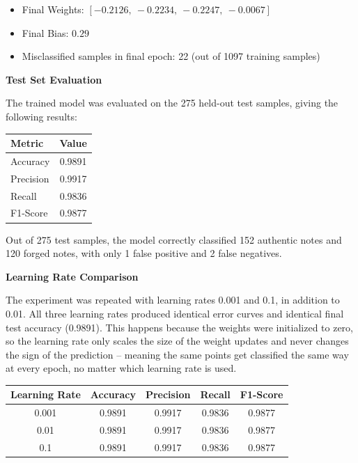 \documentclass[11pt]{article}
\begin{document}
\begin{itemize}
\item Final Weights: $[-0.2126,\ -0.2234,\ -0.2247,\ -0.0067]$
\item Final Bias: $0.29$
\item Misclassified samples in final epoch: 22 (out of 1097 training samples)
\end{itemize}

\vspace{2mm}

\textbf{Test Set Evaluation}

The trained model was evaluated on the 275 held-out test samples, giving the following results:

\begin{center}
\begin{tabular}{|l|c|}
\hline
\textbf{Metric} & \textbf{Value}\\
\hline
Accuracy  & 0.9891\\
\hline
Precision & 0.9917\\
\hline
Recall    & 0.9836\\
\hline
F1-Score  & 0.9877\\
\hline
\end{tabular}
\end{center}

Out of 275 test samples, the model correctly classified 152 authentic notes and 120 forged notes, with only 1 false positive and 2 false negatives.

\vspace{2mm}

\textbf{Learning Rate Comparison}

The experiment was repeated with learning rates 0.001 and 0.1, in addition to 0.01. All three learning rates produced identical error curves and identical final test accuracy (0.9891). This happens because the weights were initialized to zero, so the learning rate only scales the size of the weight updates and never changes the sign of the prediction -- meaning the same points get classified the same way at every epoch, no matter which learning rate is used.

\begin{center}
\begin{tabular}{|c|c|c|c|c|}
\hline
Learning Rate & Accuracy & Precision & Recall & F1-Score\\
\hline
0.001 & 0.9891 & 0.9917 & 0.9836 & 0.9877\\
\hline
0.01  & 0.9891 & 0.9917 & 0.9836 & 0.9877\\
\hline
0.1   & 0.9891 & 0.9917 & 0.9836 & 0.9877\\
\hline
\end{tabular}
\end{center}
\end{document}
